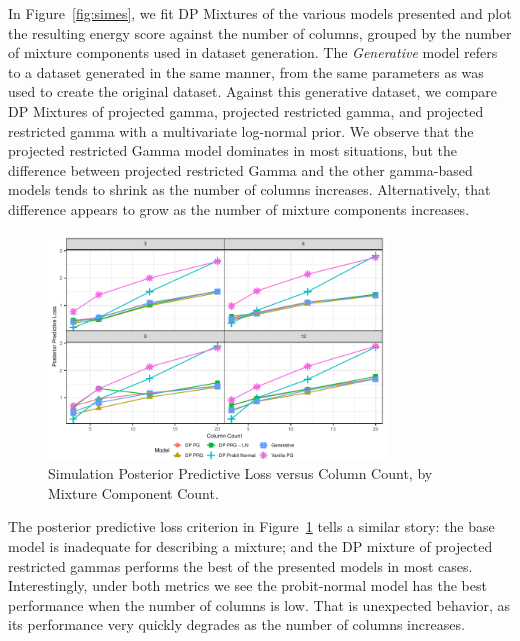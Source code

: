 In Figure~\ref{fig:simes}, we fit DP Mixtures of the various models presented and plot the resulting
  energy score against the number of columns, grouped by the number of mixture components used in
  dataset generation.  The \emph{Generative} model refers to a dataset generated
  in the same manner, from the same parameters as was used to create the original dataset.  Against
  this generative dataset, we compare DP Mixtures of projected gamma, projected restricted gamma, and
  projected restricted gamma with a multivariate log-normal prior.  We observe that the projected
  restricted Gamma model dominates in most situations, but the difference between projected restricted
  Gamma and the other gamma-based models tends to shrink as the number of columns increases.
  Alternatively, that difference appears to grow as the number of mixture components increases.

\begin{figure}[ht]
  \caption{Simulation Posterior Predictive Loss versus Column Count, by Mixture Component Count.\label{fig:simppl}}
  \centering
  \includegraphics[width=0.8\textwidth]{./images/simulation_ppl}
\end{figure}

The posterior predictive loss criterion in Figure~\ref{fig:simppl} tells a similar story: the base
  model is inadequate for describing a mixture; and the DP mixture of projected restricted gammas
  performs the best of the presented models in most cases.  Interestingly, under both metrics we see
  the probit-normal model has the best performance when the number of columns is low.  That is
  unexpected behavior, as its performance very quickly degrades as the number of columns increases.

